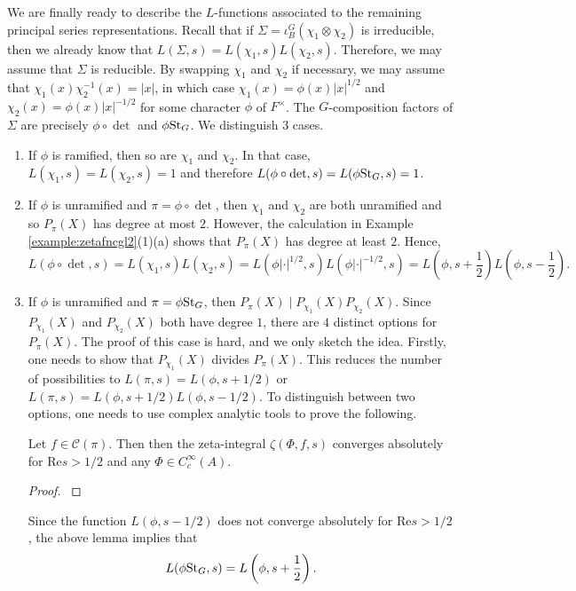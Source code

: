 We are finally ready to describe the $L$-functions associated to the remaining principal series representations. Recall that if $\Sigma=\iota_B^G(\chi_1\otimes\chi_2)$ is irreducible, then we already know that $L(\Sigma,s)=L(\chi_1,s)L(\chi_2,s)$. Therefore, we may assume that $\Sigma$ is reducible. By swapping $\chi_1$ and $\chi_2$ if necessary, we may assume that $\chi_1(x)\chi_2^{-1}(x)=|x|$, in which case $\chi_1(x)=\phi(x)|x|^{1/2}$ and $\chi_2(x)=\phi(x)|x|^{-1/2}$ for some character $\phi$ of $F^\times$. The $G$-composition factors of $\Sigma$ are precisely $\phi\circ\det$ and $\phi\mathrm{St}_G$. We distinguish $3$ cases.

\begin{enumerate}[(1)]
    \item If $\phi$ is ramified, then so are $\chi_1$ and $\chi_2$. In that case, $L(\chi_1,s)=L(\chi_2,s)=1$ and therefore $L(\phi\circ\det,s)=L(\phi\mathrm{St}_G,s)=1$.
    \item If $\phi$ is unramified and $\pi=\phi\circ\det$, then $\chi_1$ and $\chi_2$ are both unramified and so $P_\pi(X)$ has degree at most $2$. However, the calculation in Example \ref{example:zetafncgl2}(1)(a) shows that $P_\pi(X)$ has degree at least $2$. Hence,
    $$L(\phi\circ\det,s)=L(\chi_1,s)L(\chi_2,s)=L(\phi|\cdot|^{1/2},s)L(\phi|\cdot|^{-1/2},s)=L\left(\phi,s+\frac{1}{2}\right)L\left(\phi,s-\frac{1}{2}\right).$$
    \item If $\phi$ is unramified and $\pi=\phi\mathrm{St}_G$, then $P_\pi(X)\mid P_{\chi_1}(X)P_{\chi_2}(X)$. Since $P_{\chi_1}(X)$ and $P_{\chi_2}(X)$ both have degree $1$, there are $4$ distinct options for $P_\pi(X)$. The proof of this case is hard, and we only sketch the idea. Firstly, one needs to show that $P_{\chi_1}(X)$ divides $P_\pi(X)$. This reduces the number of possibilities to $L(\pi,s)=L(\phi,s+1/2)$ or $L(\pi,s)=L(\phi,s+1/2)L(\phi,s-1/2)$. To distinguish between two options, one needs to use complex analytic tools to prove the following.
    \begin{lemma}
        Let $f\in\mathcal{C}(\pi)$. Then then the zeta-integral $\zeta(\Phi,f,s)$ converges absolutely for $\mathrm{Re }s>1/2$ and any $\Phi\in C_c^\infty(A)$.
    \end{lemma}
    \begin{proof}
        \cite[Lemma 26.8]{BH1}
    \end{proof}
    Since the function $L(\phi,s-1/2)$ does not converge absolutely for $\mathrm{Re} s>1/2$, the above lemma implies that
    $$L(\phi\mathrm{St}_G,s)=L\left(\phi,s+\frac{1}{2}\right).$$
\end{enumerate}

